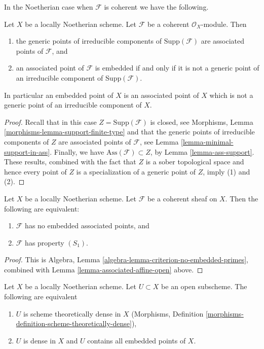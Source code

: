 \noindent
In the Noetherian case when $\mathcal{F}$ is coherent we have
the following.

\begin{lemma}
\label{lemma-embedded}
Let $X$ be a locally Noetherian scheme.
Let $\mathcal{F}$ be a coherent $\mathcal{O}_X$-module.
Then
\begin{enumerate}
\item the generic points of irreducible components of
$\text{Supp}(\mathcal{F})$ are associated points of $\mathcal{F}$, and
\item an associated point of $\mathcal{F}$ is embedded if and only
if it is not a generic point of an irreducible component
of $\text{Supp}(\mathcal{F})$.
\end{enumerate}
In particular an embedded point of $X$ is an associated point of $X$
which is not a generic point of an irreducible component of $X$.
\end{lemma}

\begin{proof}
Recall that in this case $Z = \text{Supp}(\mathcal{F})$ is closed, see
Morphisms, Lemma \ref{morphisms-lemma-support-finite-type}
and that the generic points of irreducible components of $Z$ are
associated points of $\mathcal{F}$, see
Lemma \ref{lemma-minimal-support-in-ass}.
Finally, we have $\text{Ass}(\mathcal{F}) \subset Z$, by
Lemma \ref{lemma-ass-support}.
These results, combined with the fact that $Z$ is a sober topological
space and hence every point of $Z$ is a specialization of a generic
point of $Z$, imply (1) and (2).
\end{proof}

\begin{lemma}
\label{lemma-S1-no-embedded}
Let $X$ be a locally Noetherian scheme.
Let $\mathcal{F}$ be a coherent sheaf on $X$.
Then the following are equivalent:
\begin{enumerate}
\item $\mathcal{F}$ has no embedded associated points, and
\item $\mathcal{F}$ has property $(S_1)$.
\end{enumerate}
\end{lemma}

\begin{proof}
This is Algebra, Lemma \ref{algebra-lemma-criterion-no-embedded-primes},
combined with Lemma \ref{lemma-associated-affine-open} above.
\end{proof}

\begin{lemma}
\label{lemma-scheme-theoretically-dense-contain-embedded-points}
Let $X$ be a locally Noetherian scheme. Let $U \subset X$ be an
open subscheme. The following are equivalent
\begin{enumerate}
\item $U$ is scheme theoretically dense in $X$
(Morphisms, Definition \ref{morphisms-definition-scheme-theoretically-dense}),
\item $U$ is dense in $X$ and $U$ contains all embedded points of $X$.
\end{enumerate}
\end{lemma}

